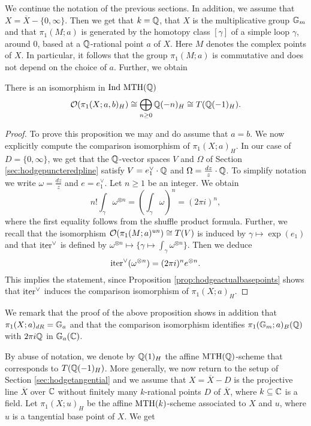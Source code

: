 We continue the notation of the previous sections. In addition, we assume that $X=\overline{X}-\{0,\infty\}$. 
Then we get that $k=\mathbb{Q}$, that $X$ is the multiplicative group $\mathbb{G}_m$ and that $\pi_1(M;a)$ is generated by the homotopy class $[\gamma]$ of a simple loop $\gamma$, around 0, based at a $\mathbb{Q}$-rational point $a$ of $X$. Here $M$ denotes the complex points of $X$. 
In particular, it follows that the group $\pi_1(M;a)$ is commutative and does not depend on the choice of $a$. Further, we obtain
\begin{prop}
There is an isomorphism in $\textnormal{Ind MTH}(\mathbb{Q})$ $$\mathcal{O}(\pi_1(X;a,b)_H)\cong \bigoplus_{n \geq 0}\mathbb{Q}(-n)_H\cong T(\mathbb{Q}(-1)_H).$$ 
\end{prop}
\begin{proof}
To prove this proposition we may and do assume that $a=b$. We now explicitly compute the comparison isomorphism of 
$\pi_1(X;a)_H$. In our case of $D=\{0,\infty\}$, we get that the $\mathbb{Q}$-vector spaces $V$ and $\Omega$ of Section \ref{sec:hodgepuncteredpline} satisfy $V=e_1^{\vee}\cdot \mathbb{Q}$ and  $\Omega=\frac{dz}{z}\cdot \mathbb{Q}$. 
To simplify notation we write $\omega=\frac{dz}{z}$ and $e=e_1^{\vee}$. 
Let $n\geq 1$ be an integer. We obtain $$n!\int_\gamma \omega^{\otimes n}=\left(\int_\gamma \omega\right)^n=(2\pi i)^n,$$
where the first equality follows from the shuffle product formula. Further, we recall that the isomorphism $\mathcal{O}(\pi_1(M;a)^{un})\cong T(V)$ is induced by $\gamma\mapsto \exp(e_1)$ and that $\mathrm{iter}^{\vee}$ is defined by $\omega^{\otimes n}\mapsto \{\gamma\mapsto \int_\gamma \omega^{\otimes n}\}$. Then we deduce  $$\mathrm{iter}^{\vee}(\omega^{\otimes n})=(2\pi i)^ne^{\otimes n}.$$ This implies the statement, since Proposition \ref{prop:hodgeactualbasepoints} shows that $\mathrm{iter}^{\vee}$ induces the comparison isomorphism of $\pi_1(X;a)_H$. 
\end{proof}

We remark that the proof of the above proposition shows in addition that $\pi_1(X;a)_{dR}=\mathbb{G}_a$ and that the comparison isomorphism identifies $\pi_1(\mathbb{G}_m;a)_B(\mathbb{Q})$ with $2\pi i\mathbb{Q}$ in $\mathbb{G}_a(\mathbb{C})$. 

By abuse of notation, we denote by $\mathbb{Q}(1)_H$ the affine $\textnormal{MTH}(\mathbb{Q})$-scheme that corresponds to $T(\mathbb{Q}(-1)_H)$. More generally, we now return to the setup of Section \ref{sec:hodgetangential} and we assume that $X=\overline{X}-D$ is the projective line $\overline{X}$ over $\mathbb{C}$ without finitely many $k$-rational points $D$ of $\overline{X}$, where $k\subseteq \mathbb{C}$ is a field. 
Let $\pi_1(X;u)_H$ be the affine $\mathrm{MTH}(k)$-scheme associated to $X$ and $u$, where $u$ is a tangential base point of $X$. We get

